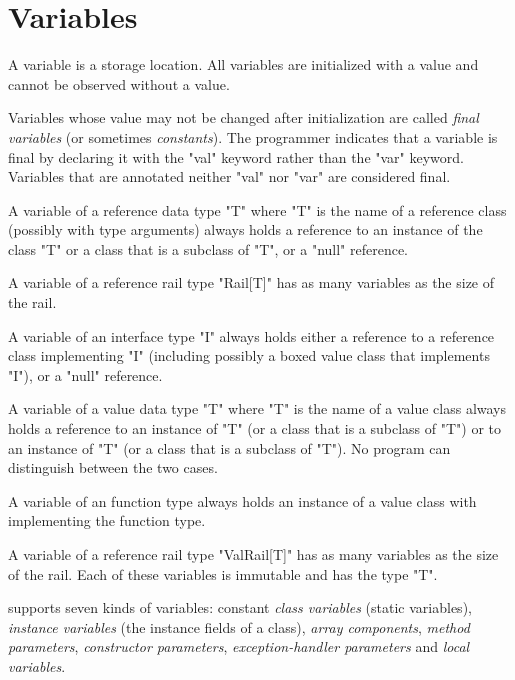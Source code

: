 
\chapter{Variables}\label{XtenVariables}

A variable is a storage location. All
variables are initialized with a value and cannot be observed
without
a value.

Variables whose value may not be changed after initialization
are called {\em final variables} (or sometimes {\em constants}).
The programmer indicates that a variable is final by declaring
it with the \xcd"val" keyword rather than the \xcd"var" keyword.
Variables that are annotated neither \xcd"val" nor \xcd"var"
are considered final.

A variable of a reference data type \xcd"T" where \xcd"T" is the name
of a reference class (possibly with type arguments) always holds a
reference to an instance of the class \xcd"T" or a class that is a
subclass of \xcd"T", or a \xcd"null" reference.

A variable of a reference rail type \xcd"Rail[T]" has
as many variables as the size of the rail.


A variable of an interface type \xcd"I" always holds either a
reference to a reference class implementing \xcd"I" (including possibly
a boxed value class that implements \xcd"I"), or a \xcd"null"
reference.

A variable of a value data type \xcd"T" where \xcd"T" is the name of a
value class always holds a reference to an instance of \xcd"T" (or a
class that is a subclass of \xcd"T") or to an instance of \xcd"T" (or a
class that is a subclass of \xcd"T"). No program can distinguish
between the two cases.

A variable of an function type always holds an instance
of a value class with implementing the function type.

A variable of a reference rail type \xcd"ValRail[T]" has
as many variables as the size of the rail.
Each of these variables is immutable and has the type \xcd"T".

\Xten{} supports seven kinds of variables: constant {\em class
variables} (static variables), {\em instance variables} (the instance
fields of a class), {\em array components}, {\em method parameters},
{\em constructor parameters}, {\em exception-handler parameters} and
{\em local variables}.

